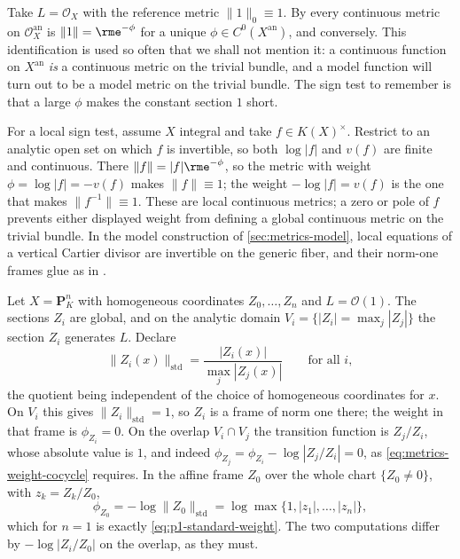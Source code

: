 \begin{example}
\label{ex:metrics-trivial-bundle}
Take $L=\mathcal O_X$ with the reference metric $\|1\|_0\equiv1$. By
 every continuous metric on
$\mathcal O_X^{\mathrm{an}}$ is $\|1\|=\rme^{-\phi}$ for a unique
$\phi\in C^0(X^{\mathrm{an}})$, and conversely. This identification is
used so often that we shall not mention it: a continuous function on
$X^{\mathrm{an}}$ \emph{is} a continuous metric on the trivial bundle, and
a model function will turn out to be a model metric on the trivial bundle.
The sign test to remember is that a large $\phi$ makes the constant
section $1$ short.

For a local sign test, assume $X$ integral and take
$f\in K(X)^\times$. Restrict to an analytic open set on which $f$ is
invertible, so both $\log|f|$ and $v(f)$ are finite and continuous. There
$\|f\|=|f|\rme^{-\phi}$, so the metric with weight
$\phi=\log|f|=-v(f)$ makes $\|f\|\equiv1$; the weight $-\log|f|=v(f)$
is the one that makes $\|f^{-1}\|\equiv1$. These are local continuous
metrics; a zero or pole of $f$ prevents either displayed weight from
defining a global continuous metric on the trivial bundle. In the model
construction of \cref{sec:metrics-model}, local equations of a vertical
Cartier divisor are invertible on the generic fiber, and their norm-one
frames glue as in .
\end{example}

\begin{example}
\label{ex:metrics-standard-projective-frames}
Let $X=\mathbf P^n_K$ with homogeneous coordinates $Z_0,\ldots,Z_n$ and
$L=\mathcal O(1)$. The sections $Z_i$ are global, and on the analytic
domain $V_i=\{|Z_i|=\max_j|Z_j|\}$ the section $Z_i$ generates $L$.
Declare
\[
 \|Z_i(x)\|_{\mathrm{std}}
 =\frac{|Z_i(x)|}{\max_j|Z_j(x)|}
 \qquad\text{for all }i,
\]
the quotient being independent of the choice of homogeneous coordinates for
$x$. On $V_i$ this gives $\|Z_i\|_{\mathrm{std}}=1$, so $Z_i$ is a
frame of norm one there; the weight in that frame is
$\phi_{Z_i}=0$. On the overlap $V_i\cap V_j$ the transition function is
$Z_j/Z_i$, whose absolute value is $1$, and indeed
$\phi_{Z_j}=\phi_{Z_i}-\log|Z_j/Z_i|=0$, as
\eqref{eq:metrics-weight-cocycle} requires. In the affine frame $Z_0$ over
the whole chart $\{Z_0\ne0\}$, with $z_k=Z_k/Z_0$,
\[
 \phi_{Z_0}=-\log\|Z_0\|_{\mathrm{std}}
 =\log\max\{1,|z_1|,\ldots,|z_n|\},
\]
which for $n=1$ is exactly \eqref{eq:p1-standard-weight}. The two
computations differ by $-\log|Z_i/Z_0|$ on the overlap, as they must.
\end{example}

